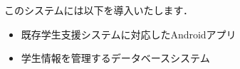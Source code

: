 このシステムには以下を導入いたします．
\begin{itemize}
\item 既存学生支援システムに対応したAndroidアプリ
\item 学生情報を管理するデータベースシステム
  \end{itemize}
